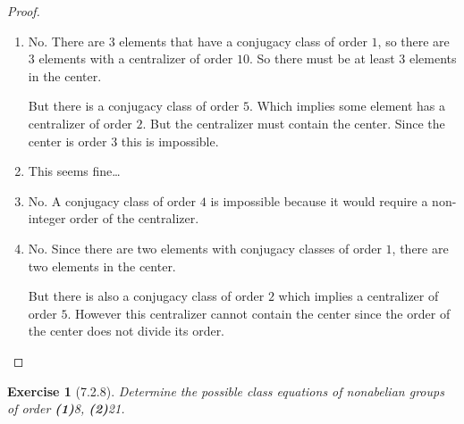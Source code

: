 \documentclass[12pt]{article}
\newtheorem*{exer}{Exercise}
\begin{document}
\begin{proof}
    \begin{enumerate}
        \item No. There are $3$ elements that have a conjugacy class of
            order $1$, so there are $3$ elements with a centralizer of
            order $10$. So there must be at least $3$ elements in the
            center.

            But there is a conjugacy class of order $5$. Which implies
            some element has a centralizer of order $2$. But the
            centralizer must contain the center. Since the center is
            order $3$ this is impossible.

        \item This seems fine\dots

        \item No. A conjugacy class of order $4$ is impossible because
            it would require a non-integer order of the centralizer.

        \item No. Since there are two elements with conjugacy classes of
            order $1$, there are two elements in the center.

            But there is also a conjugacy class of order $2$ which
            implies a centralizer of order $5$. However this
            centralizer cannot contain the center since the order of the
        center does not divide its order.

    \end{enumerate}

\end{proof}


\begin{exer}[7.2.8]
    Determine the possible class equations of nonabelian groups of order
    \textbf{(1)}8, \textbf{(2)}21.
\end{exer}
\end{document}
